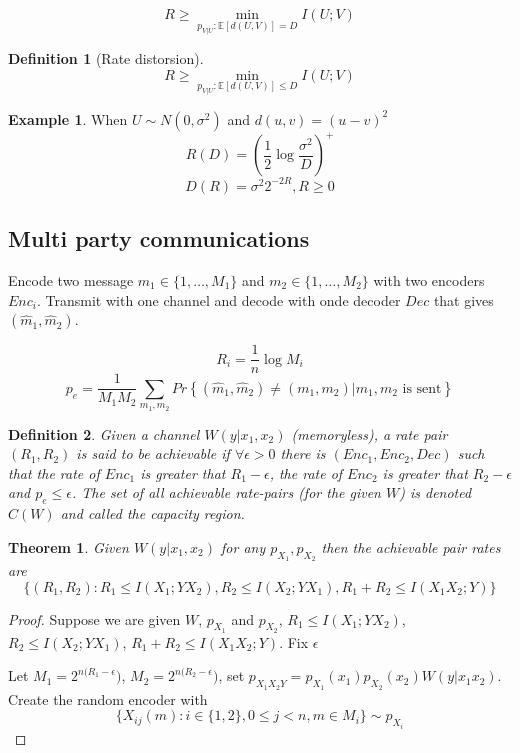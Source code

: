 \documentclass[twoside]{article}
\newtheorem{theorem}{Theorem}[section]
\newtheorem{definition}{Definition}[section]
\theoremstyle{definition} %
\newtheorem{example}{Example}
\renewcommand{\Pr}[1]{Pr\left\{#1\right\}}
\newcommand{\Ex}[1]{\mathbb{E}\left[#1\right]}
\begin{document}
\[
  R\geq \min_{p_{V|U} : \Ex{d(U,V)} = D} I(U;V)
\]

\begin{definition}[Rate distorsion]
  \[
    R\geq \min_{p_{V|U} : \Ex{d(U,V)} \leq D} I(U;V)
  \]
\end{definition}

\begin{example}
  When $U\sim N(0, \sigma^2)$ and $d(u,v) = (u-v)^2$
  \[
    R(D) = \left(\frac 1 2 \log \frac { \sigma^2} D \right)^+
  \]
  \[
    D(R) = \sigma^2 2^{-2R}, R \geq 0
  \]
\end{example}

\subsection{Multi party communications}

Encode two message $m_1 \in \{1, \dots, M_1\}$ and $m_2 \in \{1, \dots, M_2\}$ with two encoders $Enc_i$. Transmit with one channel and decode with onde decoder $Dec$ that gives $(\hat m_1, \hat m_2)$.

\[
  R_i = \frac 1 n \log M_i
\]
\[
  p_e = \frac 1 {M_1 M_2} \sum_{m_1, m_2} \Pr{(\hat m_1, \hat m_2) \not= (m_1, m_2) | m_1,m_2 \text{ is sent}}
\]

\begin{definition}
  Given a channel $W(y|x_1,x_2)$ (memoryless), a rate pair $(R_1, R_2)$ is said to be achievable if $\forall \epsilon > 0$ there is $(Enc_1, Enc_2, Dec)$ such that the rate of $Enc_1$ is greater that $R_1 - \epsilon$, the rate of $Enc_2$ is greater that $R_2 - \epsilon$ and $p_e \leq \epsilon$. The set of all achievable rate-pairs (for the given $W$) is denoted $C(W)$ and called the capacity region.
\end{definition}


\begin{theorem}
  Given $W(y|x_1,x_2)$ for any $p_{X_1}, p_{X_2}$ then the achievable pair rates are
  \[
    \{
      (R_1, R_2) : R_1 \leq I(X_1;YX_2), R_2 \leq I(X_2;YX_1), R_1+R_2 \leq I(X_1X_2;Y)
    \}
  \]
\end{theorem}



\begin{proof}
  Suppose we are given $W$, $p_{X_1}$ and $p_{X_2}$, $R_1 \leq I(X_1;YX_2)$, $R_2 \leq I(X_2;YX_1)$, $R_1 + R_2 \leq I(X_1X_2;Y)$. Fix $\epsilon$

  Let $M_1 = 2^{n(R_1 - \epsilon})$, $M_2 = 2^{n(R_2 - \epsilon})$, set $p_{X_1X_2Y} = p_{X_1}(x_1)p_{X_2}(x_2)W(y|x_1x_2)$. Create the random encoder with
  \[
    \{ X_{ij}(m) : i \in \{1,2\}, 0 \leq j < n, m \in M_i\} \sim p_{X_i}
  \]
\end{proof}
\end{document}
